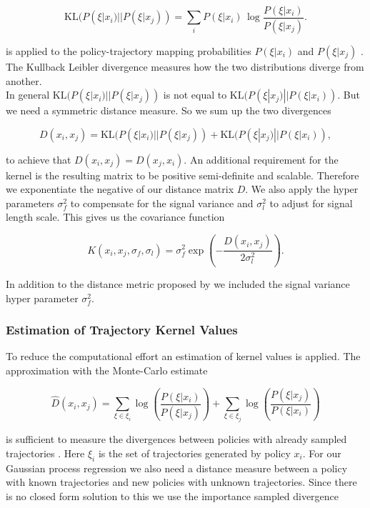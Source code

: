 $$\mathrm {KL}(P(\xi|x_{ i })||P(\xi|x_{ j })) = \sum _{i}P(\xi|x_{ i })\,\log {\frac {P(\xi|x_{ i })}{P(\xi|x_{ j })}}.$$

is applied to the policy-trajectory mapping probabilities $P(\xi|x_{ i })$ and $P(\xi|x_{ j })$ \cite{wilson2014using}. The Kullback Leibler divergence measures how the two distributions diverge from another.\\

In general $\mathrm {KL}(P(\xi|x_{ i })||P(\xi|x_{ j }))$ is not equal to $\mathrm {KL}(P(\xi|x_{ j })||P(\xi|x_{ i }))$. But we need a symmetric distance measure. So we sum up the two divergences

$$D(x_{ i }, x_{ j }) = \mathrm {KL}(P(\xi|x_{ i })||P(\xi|x_{ j })) + \mathrm {KL}(P(\xi|x_{ j })||P(\xi|x_{ i })),$$

to achieve that $D(x_{ i }, x_{ j }) = D(x_{ j }, x_{ i })$. An additional requirement for the kernel is the resulting matrix to be positive semi-definite and scalable\cite{wilson2014using}. Therefore we exponentiate the negative of our distance matrix $D$. We also apply the hyper parameters $\sigma_f^2$ to compensate for the signal variance and $\sigma_l^2$ to adjust for signal length scale. This gives us the covariance function

\begin{equation} \label{eq:trajKernel}
K(x_{ i },x_{ j },\sigma_f,\sigma_l) = \sigma_f^2 \exp\left(-\frac{D(x_i,x_j)}{2\sigma_l^2} \right).
\end{equation}

In addition to the distance metric proposed by \cite{wilson2014using} we included the signal variance hyper parameter $\sigma_f^2$.

\subsubsection{Estimation of Trajectory Kernel Values}
To reduce the computational effort an estimation of kernel values is applied. The approximation with the Monte-Carlo estimate

\begin{equation} \label{eq:tk:mc}
    \hat{D}(x_{ i }, x_{ j }) = \sum _{\xi \in \xi_i} \log\left( \frac{P(\xi|x_{ i })}{P(\xi|x_{ j })} \right) + \sum _{\xi \in \xi_j} \log\left( \frac{P(\xi|x_{ j })}{P(\xi|x_{ i })} \right)
\end{equation}

is sufficient to measure the divergences between policies with already sampled trajectories \cite{wilson2014using}. Here $\xi_i$ is the set of trajectories generated by policy $x_i$. For our Gaussian process regression we also need a distance measure between a policy with known trajectories and new policies with unknown trajectories. Since there is no closed form solution to this we use the importance sampled divergence

